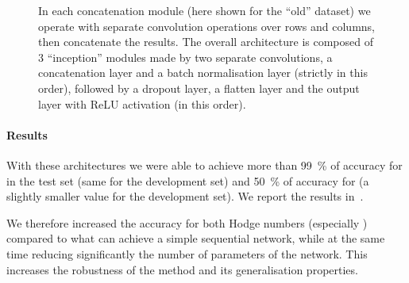 \begin{figure}[tbp]
  \centering
  \caption{%
    In each concatenation module (here shown for the ``old'' dataset) we operate with separate convolution operations over rows and columns, then concatenate the results.
    The overall architecture is composed of 3 ``inception'' modules made by two separate convolutions, a concatenation layer and a batch normalisation layer (strictly in this order), followed by a dropout layer, a flatten layer and the output layer with ReLU activation (in this order).
  }
  \label{fig:nn:inception}
\end{figure}


\paragraph{Results}

With these architectures we were able to achieve more than \SI{99}{\percent} of accuracy for  in the test set (same for the development set) and \SI{50}{\percent} of accuracy for  (a slightly smaller value for the development set).
We report the results in~.

We therefore increased the accuracy for both Hodge numbers (especially ) compared to what can achieve a simple sequential network, while at the same time reducing significantly the number of parameters of the network.\footnotemark{}
This increases the robustness of the method and its generalisation properties.

